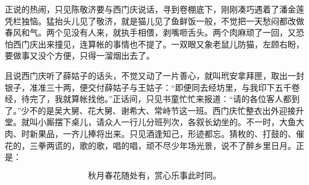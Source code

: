 正说的热闹，只见陈敬济要与西门庆说话，寻到卷棚底下，刚刚凑巧遇着了潘金莲凭栏独恼。猛抬头儿见了敬济，就是猫儿见了鱼鲜饭一般，不觉把一天愁闷都改做春风和气。两个见没有人来，就执手相偎，剥嘴咂舌头。两个肉麻顽了一回，又恐怕西门庆出来撞见，连算帐的事情也不提了。一双眼又象老鼠儿防猫，左顾右盼，要做事又没个方便，只得一溜烟出去了。

且说西门庆听了薛姑子的话头，不觉又动了一片善心，就叫玳安拿拜匣，取出一封银子，准准三十两，便交付薛姑子与王姑子：“即便同去经坊里，与我印下五千卷经，待完了，我就算帐找他。”正话间，只见书童忙忙来报道：“请的各位客人都到了。”少不的是吴大舅、花大舅、谢希大、常峙节这一班。西门庆忙整衣出外迎接升堂。就叫小厮摆下桌儿，请众人一行儿分班列次，各叙长幼坐的。不一时，大鱼大肉、时新果品，一齐儿捧将出来。只见酒逢知己，形迹都忘。猜枚的、打鼓的、催花的，三拳两谎的，歌的歌，唱的唱，顽不尽少年场光景，说不了醉乡里日月。正是：

\[
秋月春花随处有，赏心乐事此时同。
\]

